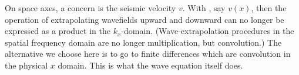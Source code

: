 On space axes, a concern is the seismic velocity  $v$.
With
, say  $v(x)$,
then the operation of extrapolating wavefields upward and downward
can no longer be expressed as a product in the $k_x$-domain.
(Wave-extrapolation procedures in the
spatial frequency domain are no longer multiplication,
but convolution.)
The alternative we choose here is to go to finite differences
which are convolution in the physical $x$ domain.
This is what the wave equation itself does.



